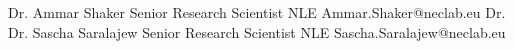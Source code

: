 

\begin{referees}
		{Dr. Ammar Shaker}
		{Senior Research Scientist}
		{NLE}
		{Ammar.Shaker@neclab.eu}
		{Dr. Dr. Sascha Saralajew}
		{Senior Research Scientist}
		{NLE}
		{Sascha.Saralajew@neclab.eu}
\end{referees}